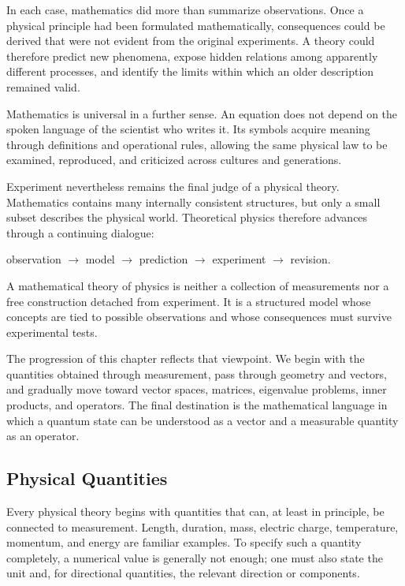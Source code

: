 In each case, mathematics did more than summarize observations. Once a physical
principle had been formulated mathematically, consequences could be derived
that were not evident from the original experiments. A theory could therefore
predict new phenomena, expose hidden relations among apparently different
processes, and identify the limits within which an older description remained
valid.

Mathematics is universal in a further sense. An equation does not depend on the
spoken language of the scientist who writes it. Its symbols acquire meaning
through definitions and operational rules, allowing the same physical law to be
examined, reproduced, and criticized across cultures and generations.

Experiment nevertheless remains the final judge of a physical theory.
Mathematics contains many internally consistent structures, but only a small
subset describes the physical world. Theoretical physics therefore advances
through a continuing dialogue:

\begin{center}
observation $\longrightarrow$ model $\longrightarrow$ prediction
$\longrightarrow$ experiment $\longrightarrow$ revision.
\end{center}

\begin{bookinsight}
A mathematical theory of physics is neither a collection of measurements nor a
free construction detached from experiment. It is a structured model whose
concepts are tied to possible observations and whose consequences must survive
experimental tests.
\end{bookinsight}

The progression of this chapter reflects that viewpoint. We begin with the
quantities obtained through measurement, pass through geometry and vectors,
and gradually move toward vector spaces, matrices, eigenvalue problems, inner
products, and operators. The final destination is the mathematical language in
which a quantum state can be understood as a vector and a measurable quantity
as an operator.

\subsection{Physical Quantities}
\label{subsec:physical-quantities}

Every physical theory begins with quantities that can, at least in principle,
be connected to measurement. Length, duration, mass, electric charge,
temperature, momentum, and energy are familiar examples. To specify such a
quantity completely, a numerical value is generally not enough; one must also
state the unit and, for directional quantities, the relevant direction or
components.

